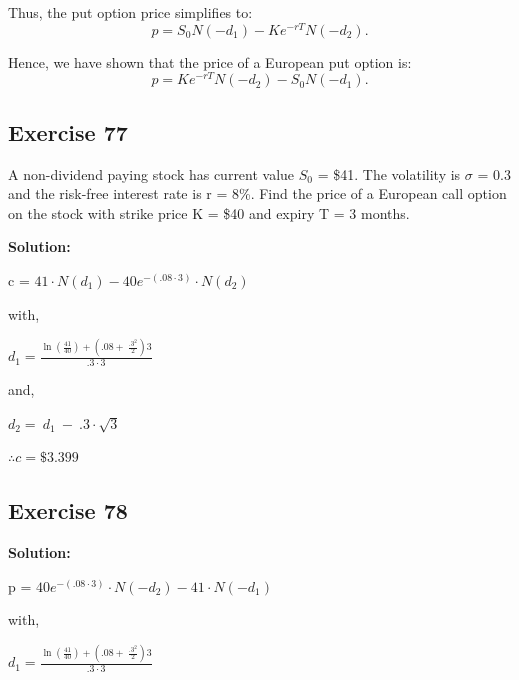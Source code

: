 \documentclass{article}
\begin{document}
Thus, the put option price simplifies to:
\[
p = S_0 N(-d_1) - Ke^{-rT} N(-d_2).
\]

Hence, we have shown that the price of a European put option is:
\[
p = Ke^{-rT} N(-d_2) - S_0 N(-d_1).
\]

\subsection*{Exercise 77}

A non-dividend paying stock has current value $S_0$ = \$41. The volatility is $\sigma$ = 0.3 and the risk-free
interest rate is r = 8\%. Find the price of a European call option on the stock with strike price K = \$40 and
expiry T = 3 months.

\textbf{Solution:}

c = $41\cdot N\left(d_{1}\right)-40e^{-\left(.08\cdot3\right)}\cdot N\left(d_{2}\right)$

\vspace{\baselineskip}

with,

\vspace{\baselineskip}

$d_{1}=\frac{\ln\left(\frac{41}{40}\right)+\left(.08+\ \frac{.3^{2}}{2}\right)3}{.3\cdot3}$

\vspace{\baselineskip}

and,

\vspace{\baselineskip}

$d_{2} =\  d_{1}\ -\ .3\cdot\sqrt{3}$

\vspace{\baselineskip}

$\therefore c = \$3.399$

\subsection*{Exercise 78}

\textbf{Solution:}

p = $40e^{-\left(.08\cdot3\right)}\cdot N\left(-d_{2}\right)-41\cdot N\left(-d_{1}\right)$

\vspace{\baselineskip}

with,

\vspace{\baselineskip}

$d_{1}=\frac{\ln\left(\frac{41}{40}\right)+\left(.08+\ \frac{.3^{2}}{2}\right)3}{.3\cdot3}$
\end{document}
